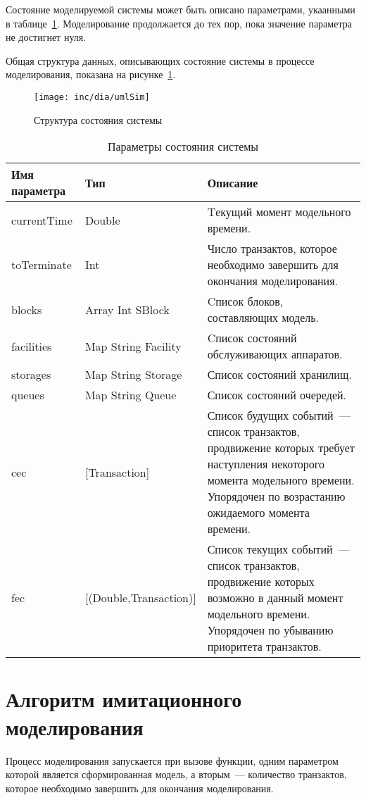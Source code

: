Состояние моделируемой системы может быть описано параметрами, укаанными в таблице~\ref{tab:simState}. Моделирование продолжается до тех пор, пока значение параметра  не достигнет нуля.

Общая структура данных, описывающих состояние системы в процессе моделирования, показана на рисунке~\ref{fig:umlSim}.

\begin{figure}[ht]
  \centering
  \texttt{[image: inc/dia/umlSim]}
  \caption{Структура состояния системы}
  \label{fig:umlSim}
\end{figure}


\begin{table}[ht!]
\caption{Параметры состояния системы}
\label{tab:simState}
\begin{tabular}{|l|l|p{}|}
\hline
Имя параметра & Тип & Описание \\
\hline
currentTime & Double & Tекущий момент модельного времени.\\
\hline
toTerminate & Int & Число транзактов, которое необходимо завершить для окончания моделирования.\\
\hline
blocks & Array Int SBlock & Cписок блоков, составляющих модель.\\
\hline
facilities & Map String Facility & Cписок состояний обслуживающих аппаратов.\\
\hline
storages & Map String Storage & Список состояний хранилищ.\\
\hline
queues & Map String Queue & Список состояний очередей.\\
\hline
cec & [Transaction] & Список будущих событий~--- список транзактов, продвижение которых требует наступления некоторого момента модельного времени. Упорядочен по возрастанию ожидаемого момента времени. \\
\hline
fec & [(Double,Transaction)] & Список текущих событий~--- список транзактов, продвижение которых возможно в данный момент модельного времени. Упорядочен по убыванию приоритета транзактов. \\
\hline
\end{tabular}
\end{table}


\section{Алгоритм имитационного моделирования}

Процесс моделирования запускается при вызове функции, одним параметром которой является сформированная модель, а вторым~--- количество транзактов, которое необходимо завершить для окончания моделирования.

